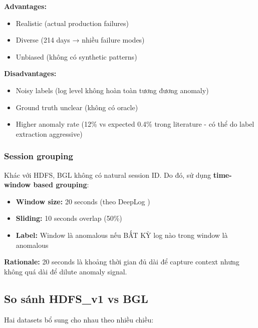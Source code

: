 \textbf{Advantages:}
\begin{itemize}
    \item Realistic (actual production failures)
    \item Diverse (214 days → nhiều failure modes)
    \item Unbiased (không có synthetic patterns)
\end{itemize}

\textbf{Disadvantages:}
\begin{itemize}
    \item Noisy labels (log level không hoàn toàn tương đương anomaly)
    \item Ground truth unclear (không có oracle)
    \item Higher anomaly rate (12\% vs expected 0.4\% trong literature - có thể do label extraction aggressive)
\end{itemize}

\subsubsection{Session grouping}

Khác với HDFS, BGL không có natural session ID. Do đó, sử dụng \textbf{time-window based grouping}:

\begin{itemize}
    \item \textbf{Window size:} 20 seconds (theo DeepLog \cite{du2017deeplog})
    \item \textbf{Sliding:} 10 seconds overlap (50\%)
    \item \textbf{Label:} Window là anomalous nếu BẤT KỲ log nào trong window là anomalous
\end{itemize}

\textbf{Rationale:} 20 seconds là khoảng thời gian đủ dài để capture context nhưng không quá dài để dilute anomaly signal.

\subsection{So sánh HDFS\_v1 vs BGL}

Hai datasets bổ sung cho nhau theo nhiều chiều:

